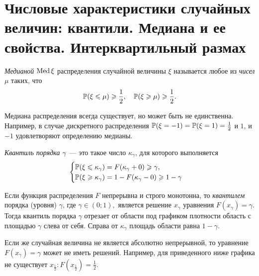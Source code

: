 \section {Числовые характеристики случайных величин: квантили. Медиана и ее свойства. Интерквартильный размах}

\begin{defn}
    \textit{Медианой} $\operatorname{Med} \xi$ распределения случайной величины $\xi$ называется любое из \textit{чисел} $\mu$ таких, что
    \begin{equation*}
        \operatorname{\mathbb{P}}(\xi \leqslant \mu) \geqslant \frac{1}{2}, ~~~ \operatorname{\mathbb{P}}(\xi \geqslant \mu) \geqslant \frac{1}{2}.
    \end{equation*}
\end{defn} 

\begin{rmrk}
    Медиана распределения всегда существует, но может быть не единственна. 
    Например, в случае дискретного распределения $\operatorname{\mathbb{P}}(\xi = -1) = \operatorname{\mathbb{P}}(\xi = 1) = \frac{1}{2}$ и $1$, и $-1$ удовлетворяют определению медианы.
\end{rmrk} 

\begin{defn}
\textit{Квантиль порядка $\gamma$}~--- это такое число $\kappa_\gamma$, для которого выполняется
\begin{equation*}
    \begin{cases} 
        \operatorname{\mathbb{P}}(\xi \leqslant \kappa_\gamma) = F(\kappa_\gamma + 0) \geqslant \gamma, \\
        \operatorname{\mathbb{P}}(\xi \geqslant \kappa_\gamma) = 1 - F(\kappa_\gamma - 0) \geqslant 1 - \gamma
    \end{cases}
\end{equation*}
\end{defn}

\begin{rmrk}
    Если функция распределения $F$ непрерывна и строго монотонна, то \textit{квантилем} порядка (уровня) $\gamma$, где $\gamma \in (0; 1), $ является решение $x_\gamma$ уравнения $F(x_\gamma) = \gamma.$ 
    Тогда квантиль порядка $\gamma$ отрезает от области под графиком плотности область с площадью $\gamma$ слева от себя. Справа от $\kappa_\gamma$ площадь области равна $1 - \gamma$.
    
    Если же случайная величина не является абсолютно непрерывной, то уравнение $F(x_\gamma) = \gamma$ может не иметь решений. Например, для приведенного ниже графика не существует $x_{\frac{1}{2}}: F(x_{\frac{1}{2}}) = \frac{1}{2}$.
    
\end{rmrk} 

